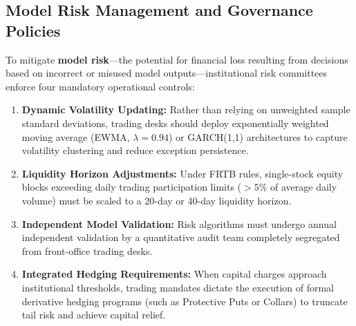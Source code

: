 \subsection{Model Risk Management and Governance Policies}

To mitigate \textbf{model risk}—the potential for financial loss resulting from decisions based on incorrect or misused model outputs—institutional risk committees enforce four mandatory operational controls:

\begin{enumerate}[leftmargin=1.8em, label=(\roman*)]
    \item \textbf{Dynamic Volatility Updating:} Rather than relying on unweighted sample standard deviations, trading desks should deploy exponentially weighted moving average (EWMA, $\lambda = 0.94$) or GARCH(1,1) architectures to capture volatility clustering and reduce exception persistence.
    \item \textbf{Liquidity Horizon Adjustments:} Under FRTB rules, single-stock equity blocks exceeding daily trading participation limits ($>5\%$ of average daily volume) must be scaled to a 20-day or 40-day liquidity horizon.
    \item \textbf{Independent Model Validation:} Risk algorithms must undergo annual independent validation by a quantitative audit team completely segregated from front-office trading desks.
    \item \textbf{Integrated Hedging Requirements:} When capital charges approach institutional thresholds, trading mandates dictate the execution of formal derivative hedging programs (such as Protective Puts or Collars) to truncate tail risk and achieve capital relief.
\end{enumerate}

\clearpage
